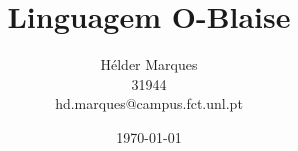 \documentclass[a4paper,oneside,titlepage]{report}
\title{\LARGE{Linguagem O-Blaise} \\}
\author{Hélder Marques \\ 31944 \\ hd.marques@campus.fct.unl.pt}
\date{\today}
\begin{document}

\newpage

\renewcommand{\contentsname}{Índice}
\tableofcontents
\newpage


\newpage


\newpage


\newpage


\newpage
\end{document}
